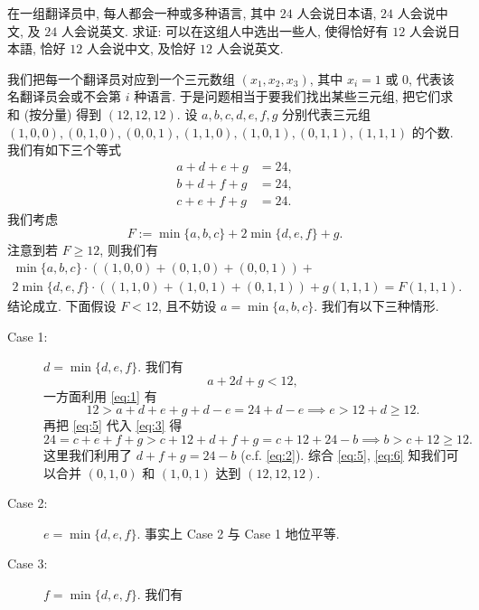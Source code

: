 \begin{prob}
\label{prob:prob-6}
在一组翻译员中, 每人都会一种或多种语言, 其中 $24$ 人会说日本语,
$24$ 人会说中文, 及 $24$ 人会说英文. 求证: 可以在这组人中选出一些人,
使得恰好有 $12$ 人会说日本語, 恰好 $12$ 人会说中文,
及恰好 $12$ 人会说英文.
\end{prob}

\begin{soln}
我们把每一个翻译员对应到一个三元数组 $(x_1, x_2, x_3)$,
其中 $x_i = 1$ 或 $0$, 代表该名翻译员会或不会第 $i$ 种语言.
于是问题相当于要我们找出某些三元组, 把它们求和 (按分量) 得到 $(12, 12, 12)$.
设 $a, b, c, d, e, f, g$ 分别代表三元组
$(1,0,0), (0,1,0), (0,0,1), (1,1,0), (1,0,1), (0,1,1), (1,1,1)$ 的个数.
我们有如下三个等式
\begin{align}
\label{eq:1}
a + d + e + g &= 24,\\
\label{eq:2}
b + d + f + g &= 24,\\
\label{eq:3}
c + e + f + g &= 24.
\end{align}
我们考虑
\[
F := \min\{a,b,c\} + 2\min\{d,e,f\} + g.
\]
注意到若 $F \ge 12$, 则我们有
\begin{multline*}
\min\{a,b,c\}\cdot ((1,0,0) + (0,1,0) + (0,0,1)) +\\
2\min\{d,e,f\}\cdot ((1,1,0) + (1,0,1) + (0,1,1)) +
g(1,1,1) = F(1,1,1).
\end{multline*}
结论成立. 下面假设 $F < 12$, 且不妨设 $a = \min\{a, b, c\}$.
我们有以下三种情形.
\begin{description}
\item[Case 1:] $d = \min\{d,e,f\}$. 我们有
\begin{equation}
\label{eq:4}
a + 2d + g < 12,
\end{equation}
一方面利用 \cref{eq:1} 有
\begin{equation}
\label{eq:5}
12 > a + d + e + g + d - e = 24 + d - e \implies e > 12 + d \ge 12.
\end{equation}
再把 \cref{eq:5} 代入 \cref{eq:3} 得
\begin{equation}
\label{eq:6}
24 = c + e + f + g > c + 12 + d + f + g =
c + 12 + 24 - b \implies b > c + 12 \ge 12.
\end{equation}
这里我们利用了 $d + f + g = 24 - b$ (c.f. \cref{eq:2}).
综合 \cref{eq:5}, \cref{eq:6} 知我们可以合并
$(0,1,0)$ 和 $(1,0,1)$ 达到 $(12,12,12)$.
\item[Case 2:] $e = \min\{d,e,f\}$. 事实上 Case 2 与 Case 1 地位平等.
\item[Case 3:] $f = \min\{d,e,f\}$. 我们有

\end{description}
\end{soln}
